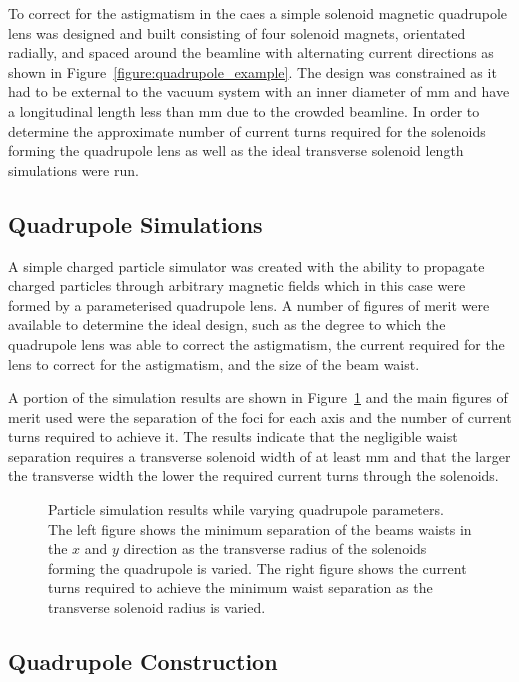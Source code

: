 To correct for the astigmatism in the \gls{caes} a simple solenoid magnetic quadrupole lens was designed and built consisting of four solenoid magnets, orientated radially, and spaced around the beamline with alternating current directions as shown in Figure~\ref{figure:quadrupole_example}.
The design was constrained as it had to be external to the vacuum system with an inner diameter of \unit[70]{mm} and have a longitudinal length less than \unit[20]{mm} due to the crowded beamline.
In order to determine the approximate number of current turns required for the solenoids forming the quadrupole lens as well as the ideal transverse solenoid length simulations were run.

\subsection{Quadrupole Simulations}

A simple charged particle simulator was created with the ability to propagate charged particles through arbitrary magnetic fields which in this case were formed by a parameterised quadrupole lens.
A number of figures of merit were available to determine the ideal design, such as the degree to which the quadrupole lens was able to correct the astigmatism, the current required for the lens to correct for the astigmatism, and the size of the beam waist.

A portion of the simulation results are shown in Figure~\ref{figure:quad_sims} and the main figures of merit used were the separation of the foci for each axis and the number of current turns required to achieve it.
The results indicate that the negligible waist separation requires a transverse solenoid width of at least \unit[35]{mm} and that the larger the transverse width the lower the required current turns through the solenoids.

\begin{figure}
    \centering
    
    \caption[Quadrupole simulation results.]{Particle simulation results while varying quadrupole parameters. The left figure shows the minimum separation of the beams waists in the $x$ and $y$ direction as the transverse radius of the solenoids forming the quadrupole is varied. The right figure shows the current turns required to achieve the minimum waist separation as the transverse solenoid radius is varied.}
    \label{figure:quad_sims}
\end{figure}

\subsection{Quadrupole Construction}

